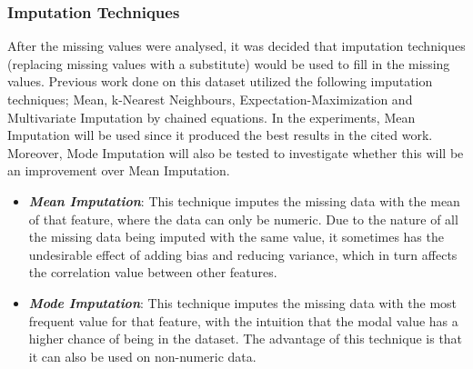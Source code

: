 \subsubsection{Imputation Techniques}\label{sssec:imputetech}

\noindent After the missing values were analysed, it was decided that imputation techniques (replacing missing values with a substitute) would be used to fill in the missing values. Previous work done on this dataset \cite{saisree:github} utilized the following imputation techniques; Mean, k-Nearest Neighbours, Expectation-Maximization and Multivariate Imputation by chained equations. In the experiments, Mean Imputation will be used since it produced the best results in the cited work. Moreover, Mode Imputation will also be tested to investigate whether this will be an improvement over Mean Imputation. 
\vspace{-3.5mm}
\begin{itemize}
\itemsep0em
    \item \textbf{\textit{Mean Imputation}}: This technique imputes the missing data with the mean of that feature, where the data can only be numeric. Due to the nature of all the missing data being imputed with the same value, it sometimes has the undesirable effect of adding bias and reducing variance, which in turn affects the correlation value between other features. 
    \item \textbf{\textit{Mode Imputation}}: This technique imputes the missing data with the most frequent value for that feature, with the intuition that the modal value has a higher chance of being in the dataset. The advantage of this technique is that it can also be used on non-numeric data.
\end{itemize}
\vspace{-3.5mm}